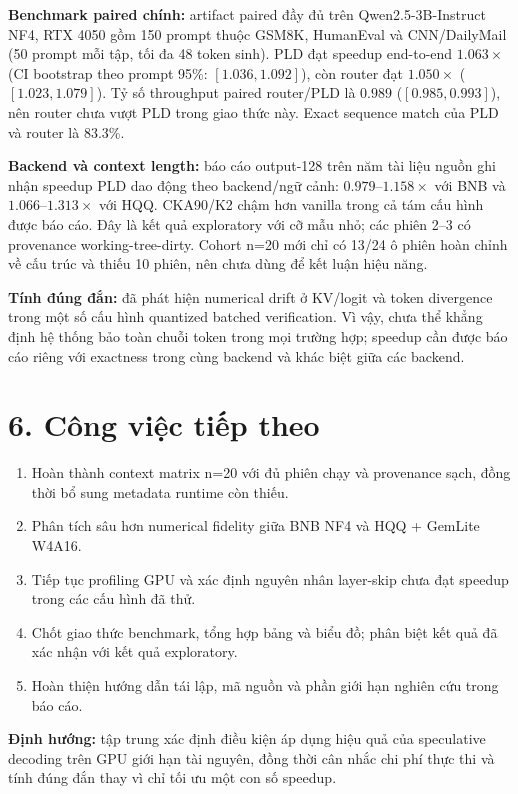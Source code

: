 \textbf{Benchmark paired chính:} artifact paired đầy đủ trên Qwen2.5-3B-Instruct NF4, RTX 4050 gồm 150 prompt thuộc GSM8K, HumanEval và CNN/DailyMail (50 prompt mỗi tập, tối đa 48 token sinh). PLD đạt speedup end-to-end $1.063\times$ (CI bootstrap theo prompt 95\%: $[1.036,1.092]$), còn router đạt $1.050\times$ ($[1.023,1.079]$). Tỷ số throughput paired router/PLD là $0.989$ ($[0.985,0.993]$), nên router chưa vượt PLD trong giao thức này. Exact sequence match của PLD và router là 83.3\%.

\textbf{Backend và context length:} báo cáo output-128 trên năm tài liệu nguồn ghi nhận speedup PLD dao động theo backend/ngữ cảnh: $0.979$--$1.158\times$ với BNB và $1.066$--$1.313\times$ với HQQ. CKA90/K2 chậm hơn vanilla trong cả tám cấu hình được báo cáo. Đây là kết quả exploratory với cỡ mẫu nhỏ; các phiên 2--3 có provenance working-tree-dirty. Cohort n=20 mới chỉ có 13/24 ô phiên hoàn chỉnh về cấu trúc và thiếu 10 phiên, nên chưa dùng để kết luận hiệu năng.

\textbf{Tính đúng đắn:} đã phát hiện numerical drift ở KV/logit và token divergence trong một số cấu hình quantized batched verification. Vì vậy, chưa thể khẳng định hệ thống bảo toàn chuỗi token trong mọi trường hợp; speedup cần được báo cáo riêng với exactness trong cùng backend và khác biệt giữa các backend.

\section*{6. Công việc tiếp theo}
\begin{enumerate}
    \item Hoàn thành context matrix n=20 với đủ phiên chạy và provenance sạch, đồng thời bổ sung metadata runtime còn thiếu.
    \item Phân tích sâu hơn numerical fidelity giữa BNB NF4 và HQQ + GemLite W4A16.
    \item Tiếp tục profiling GPU và xác định nguyên nhân layer-skip chưa đạt speedup trong các cấu hình đã thử.
    \item Chốt giao thức benchmark, tổng hợp bảng và biểu đồ; phân biệt kết quả đã xác nhận với kết quả exploratory.
    \item Hoàn thiện hướng dẫn tái lập, mã nguồn và phần giới hạn nghiên cứu trong báo cáo.
\end{enumerate}

\noindent\textbf{Định hướng:} tập trung xác định điều kiện áp dụng hiệu quả của speculative decoding trên GPU giới hạn tài nguyên, đồng thời cân nhắc chi phí thực thi và tính đúng đắn thay vì chỉ tối ưu một con số speedup.
